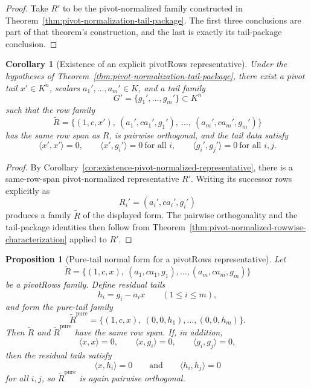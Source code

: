 \documentclass[12pt]{article}
\newtheorem{prop}[theorem]{Proposition}
\newtheorem{cor}[theorem]{Corollary}
\begin{document}
\begin{proof}
Take $R'$ to be the pivot-normalized family constructed in Theorem~\ref{thm:pivot-normalization-tail-package}. The first three conclusions are part of that theorem's construction, and the last is exactly its tail-package conclusion.
\end{proof}

\begin{cor}[Existence of an explicit pivotRows representative]
\label{cor:existence-explicit-pivotrows-representative}
Under the hypotheses of Theorem~\ref{thm:pivot-normalization-tail-package}, there exist a pivot tail $x'\in K^n$, scalars $a_1',\dots,a_m'\in K$, and a tail family
\[
G'=\{g_1',\dots,g_m'\}\subset K^n
\]
such that the row family
\[
\widetilde{R}
=
\{(1,c,x'),\ (a_1',c a_1',g_1'),\ \dots,\ (a_m',c a_m',g_m')\}
\]
has the same row span as $R$, is pairwise orthogonal, and the tail data satisfy
\[
\langle x',x'\rangle=0,
\qquad
\langle x',g_i'\rangle=0 \ \text{for all } i,
\qquad
\langle g_i',g_j'\rangle=0 \ \text{for all } i,j.
\]
\end{cor}

\begin{proof}
By Corollary~\ref{cor:existence-pivot-normalized-representative}, there is a same-row-span pivot-normalized representative $R'$. Writing its successor rows explicitly as
\[
R_i'=(a_i',c a_i',g_i')
\]
produces a family $\widetilde{R}$ of the displayed form. The pairwise orthogonality and the tail-package identities then follow from Theorem~\ref{thm:pivot-normalized-rowwise-characterization} applied to $R'$.
\end{proof}

\begin{prop}[Pure-tail normal form for a pivotRows representative]
\label{prop:pivotrows-pure-tail-normal-form}
Let
\[
\widetilde{R}
=
\{(1,c,x),\ (a_1,c a_1,g_1),\dots,(a_m,c a_m,g_m)\}
\]
be a pivotRows family. Define residual tails
\[
h_i = g_i - a_i x \qquad (1\le i\le m),
\]
and form the pure-tail family
\[
\widetilde{R}^{\mathrm{pure}}
=
\{(1,c,x),\ (0,0,h_1),\dots,(0,0,h_m)\}.
\]
Then $\widetilde{R}$ and $\widetilde{R}^{\mathrm{pure}}$ have the same row span. If, in addition,
\[
\langle x,x\rangle=0,\qquad \langle x,g_i\rangle=0,\qquad \langle g_i,g_j\rangle=0,
\]
then the residual tails satisfy
\[
\langle x,h_i\rangle=0
\qquad\text{and}\qquad
\langle h_i,h_j\rangle=0
\]
for all $i,j$, so $\widetilde{R}^{\mathrm{pure}}$ is again pairwise orthogonal.
\end{prop}
\end{document}
